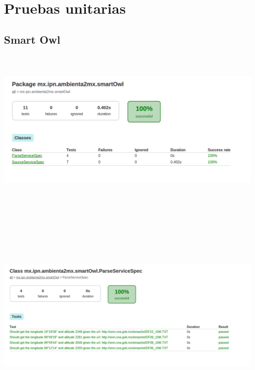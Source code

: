 \newpage
\section*{Pruebas unitarias}
\subsection{Smart Owl}
\begin{center}
  \includegraphics[width=18cm, height=8cm]{images/SmartOwlTest1}
\end{center}

\begin{center}
  \includegraphics[width=19.5cm, height=11cm]{images/SmartOwlTest2}
\end{center}

